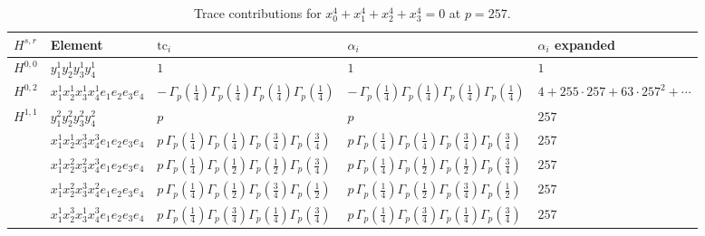 \documentclass[11pt]{article}
\begin{document}
\begin{table}[ht]
\centering
\caption{Trace contributions for $x_0^{4} + x_1^{4} + x_2^{4} + x_3^{4} = 0$ at $p=257$.}\label{tab:diagonal-14}
\renewcommand{\arraystretch}{1.1}
{\scriptsize
\begin{tabular}{@{}lllll@{}}
\toprule
$H^{s,r}$ & Element & $\mathrm{tc}_i$ & $\alpha_i$ & $\alpha_i$ expanded \\
\midrule
$H^{0,0}$ & $y_{1}^{1} y_{2}^{1} y_{3}^{1} y_{4}^{1}$ & $1$ & $1$ & $1$ \\
\midrule
$H^{0,2}$ & $x_{1}^{1} x_{2}^{1} x_{3}^{1} x_{4}^{1}  e_{1} e_{2} e_{3} e_{4}$ & $- \, \Gamma_p \left( \frac{1}{4} \right) \Gamma_p \left( \frac{1}{4} \right) \Gamma_p \left( \frac{1}{4} \right) \Gamma_p \left( \frac{1}{4} \right)$ & $- \, \Gamma_p \left( \frac{1}{4} \right) \Gamma_p \left( \frac{1}{4} \right) \Gamma_p \left( \frac{1}{4} \right) \Gamma_p \left( \frac{1}{4} \right)$ & $4{+}255{\cdot}257{+}63{\cdot}257^{2}{+}\cdots$ \\
\midrule
$H^{1,1}$ & $y_{1}^{2} y_{2}^{2} y_{3}^{2} y_{4}^{2}$ & $p \,$ & $p \,$ & $257$ \\
 & $x_{1}^{1} x_{2}^{1} x_{3}^{3} x_{4}^{3}  e_{1} e_{2} e_{3} e_{4}$ & $p \, \Gamma_p \left( \frac{1}{4} \right) \Gamma_p \left( \frac{1}{4} \right) \Gamma_p \left( \frac{3}{4} \right) \Gamma_p \left( \frac{3}{4} \right)$ & $p \, \Gamma_p \left( \frac{1}{4} \right) \Gamma_p \left( \frac{1}{4} \right) \Gamma_p \left( \frac{3}{4} \right) \Gamma_p \left( \frac{3}{4} \right)$ & $257$ \\
 & $x_{1}^{1} x_{2}^{2} x_{3}^{2} x_{4}^{3}  e_{1} e_{2} e_{3} e_{4}$ & $p \, \Gamma_p \left( \frac{1}{4} \right) \Gamma_p \left( \frac{1}{2} \right) \Gamma_p \left( \frac{1}{2} \right) \Gamma_p \left( \frac{3}{4} \right)$ & $p \, \Gamma_p \left( \frac{1}{4} \right) \Gamma_p \left( \frac{1}{2} \right) \Gamma_p \left( \frac{1}{2} \right) \Gamma_p \left( \frac{3}{4} \right)$ & $257$ \\
 & $x_{1}^{1} x_{2}^{2} x_{3}^{3} x_{4}^{2}  e_{1} e_{2} e_{3} e_{4}$ & $p \, \Gamma_p \left( \frac{1}{4} \right) \Gamma_p \left( \frac{1}{2} \right) \Gamma_p \left( \frac{3}{4} \right) \Gamma_p \left( \frac{1}{2} \right)$ & $p \, \Gamma_p \left( \frac{1}{4} \right) \Gamma_p \left( \frac{1}{2} \right) \Gamma_p \left( \frac{3}{4} \right) \Gamma_p \left( \frac{1}{2} \right)$ & $257$ \\
 & $x_{1}^{1} x_{2}^{3} x_{3}^{1} x_{4}^{3}  e_{1} e_{2} e_{3} e_{4}$ & $p \, \Gamma_p \left( \frac{1}{4} \right) \Gamma_p \left( \frac{3}{4} \right) \Gamma_p \left( \frac{1}{4} \right) \Gamma_p \left( \frac{3}{4} \right)$ & $p \, \Gamma_p \left( \frac{1}{4} \right) \Gamma_p \left( \frac{3}{4} \right) \Gamma_p \left( \frac{1}{4} \right) \Gamma_p \left( \frac{3}{4} \right)$ & $257$ \\

\end{tabular}}
\end{table}
\end{document}
